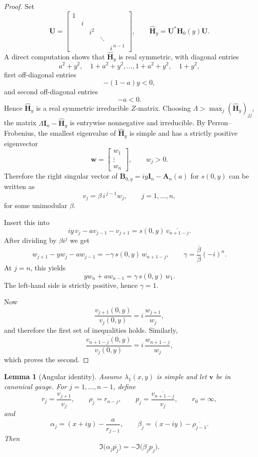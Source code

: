 \documentclass[11pt]{article}
\numberwithin{equation}{section}
\newtheorem{lemma}[theorem]{Lemma}
\begin{document}
\begin{proof}
Set
\[
\mathbf U=
\begin{bmatrix}
1 \\
& i \\
&& i^2 \\
&&& \ddots \\
&&&& i^{\,n-1}
\end{bmatrix},
\qquad
\widehat{\mathbf H}_y=\mathbf U^* \mathbf H_0(y)\mathbf U.
\]
A direct computation shows that $\widehat{\mathbf H}_y$ is real symmetric,
with diagonal entries
\[
a^2+y^2,\quad 1+a^2+y^2,\dots,1+a^2+y^2,\quad 1+y^2,
\]
first off-diagonal entries
\[
-(1-a)y<0,
\]
and second off-diagonal entries
\[
-a<0.
\]
Hence $\widehat{\mathbf H}_y$ is a real symmetric irreducible $Z$-matrix.
Choosing $\Lambda>\max_j (\widehat{\mathbf H}_y)_{jj}$, the matrix
$\Lambda\mathbf I_n-\widehat{\mathbf H}_y$ is entrywise nonnegative and
irreducible.  By Perron--Frobenius, the smallest eigenvalue of
$\widehat{\mathbf H}_y$ is simple and has a strictly positive eigenvector
\[
\bm w=
\begin{bmatrix}
w_1\\
\vdots\\
w_n
\end{bmatrix},
\qquad
w_j>0.
\]
Therefore the right singular vector of $\mathbf B_{0,y}=iy\mathbf I_n-\mathbf A_n(a)$
for $s(0,y)$ can be written as
\[
v_j=\beta\,i^{\,j-1}w_j,
\qquad
j=1,\dots,n,
\]
for some unimodular $\beta$.

Insert this into
\[
iy\,v_j-av_{j-1}-v_{j+1}=s(0,y)\,\overline{v_{n+1-j}}.
\]
After dividing by $\beta i^j$ we get
\[
w_{j+1}-yw_j-aw_{j-1}
=
-\gamma\,s(0,y)\,w_{n+1-j},
\qquad
\gamma=\frac{\overline\beta}{\beta}(-i)^n.
\]
At $j=n$, this yields
\[
yw_n+aw_{n-1}=\gamma\,s(0,y)\,w_1.
\]
The left-hand side is strictly positive, hence $\gamma=1$.

Now
\[
\frac{v_{j+1}(0,y)}{v_j(0,y)}
=
i\,\frac{w_{j+1}}{w_j},
\]
and therefore the first set of inequalities holds.  Similarly,
\[
\frac{\overline{v_{n+1-j}(0,y)}}{v_j(0,y)}
=
i\,\frac{w_{n+1-j}}{w_j},
\]
which proves the second.
\end{proof}

\begin{lemma}[Angular identity]\label{lem:angular}
Assume $\lambda_1(x,y)$ is simple and let $\bm v$ be in canonical gauge.
For $j=1,\dots,n-1$, define
\[
r_j=\frac{v_{j+1}}{v_j},
\qquad
\rho_j=r_{n-j},
\qquad
p_j=\frac{\overline{v_{n+1-j}}}{v_j},
\qquad
r_0=\infty,
\]
and
\[
\alpha_j=(x+iy)-\frac{a}{r_{j-1}},
\qquad
\beta_j=(x-iy)-\overline{\rho_{j-1}}.
\]
Then
\[
\Im\!\bigl(\alpha_j\overline{p_j}\bigr)
=
-\Im\!\bigl(\beta_j p_j\bigr).
\]
\end{lemma}
\end{document}
